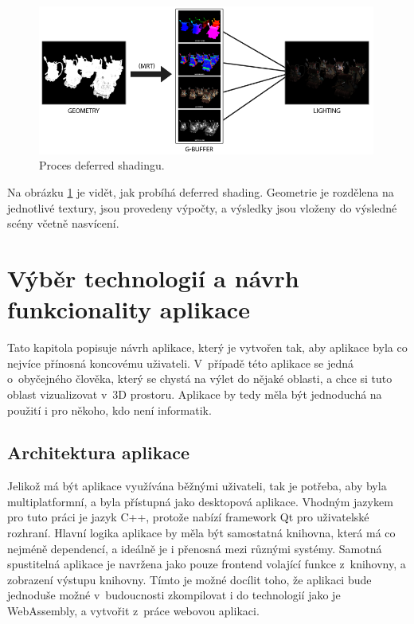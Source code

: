 \begin{figure}[H]
	\centering
	\includegraphics[width=30em]{images/navrh/deferred_overview.png}
	\caption[caption]{Proces deferred shadingu. \footnotemark} 
	\label{g-buffer-overview}
\end{figure}



Na obrázku \ref{g-buffer-overview} je vidět, jak probíhá deferred shading. Geometrie je rozdělena na jednotlivé textury, jsou provedeny výpočty, a výsledky jsou vloženy do výsledné scény včetně nasvícení.



\pagebreak
\chapter{Výběr technologií a návrh funkcionality aplikace}
Tato kapitola popisuje návrh aplikace, který je vytvořen tak, aby aplikace byla co nejvíce přínosná koncovému uživateli. V~případě této aplikace se jedná o~obyčejného člověka, který se chystá na výlet do nějaké oblasti, a chce si tuto oblast vizualizovat v~3D prostoru. Aplikace by tedy měla být jednoduchá na použití i pro někoho, kdo není informatik. 

\section{Architektura aplikace}
Jelikož má být aplikace využívána běžnými uživateli, tak je potřeba, aby byla multiplatformní, a byla přístupná jako desktopová aplikace. Vhodným jazykem pro tuto práci je jazyk C++, protože nabízí framework Qt pro uživatelské rozhraní. Hlavní logika aplikace by měla být samostatná knihovna, která má co nejméně dependencí, a ideálně je i přenosná mezi různými systémy. Samotná spustitelná aplikace je navržena jako pouze frontend volající funkce z~knihovny, a zobrazení výstupu knihovny. Tímto je možné docílit toho, že aplikaci bude jednoduše možné v~budoucnosti zkompilovat i do technologií jako je WebAssembly, a vytvořit z~práce webovou aplikaci.

